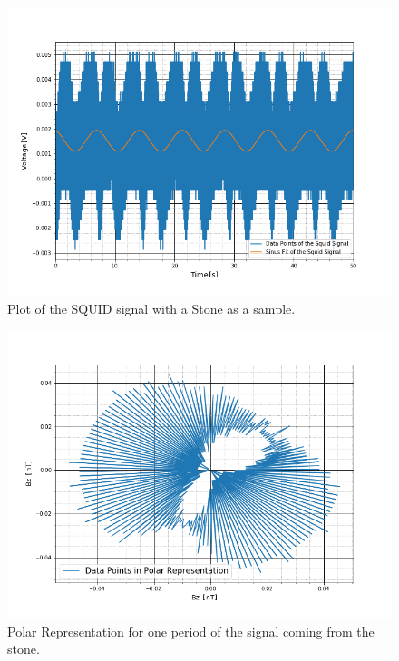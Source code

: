 \begin{figure}[ht]
	\includegraphics[scale=0.5]{Bild/P4_4}
	\centering
	\caption[SQUID signal of Stone 4]{Plot of the SQUID signal with a Stone as a sample.}
	\label{Sto}
\end{figure}
\begin{figure}[ht]
	\includegraphics[scale=0.5]{Bild/Stein}
	\centering
	\caption[Polar Representation for a Stone]{Polar Representation for one period of the signal coming from the stone.}
\end{figure}
